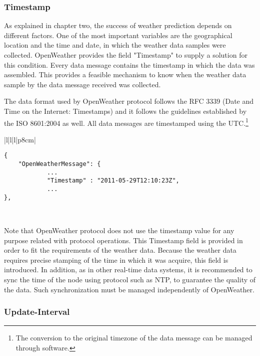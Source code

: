 \subsubsection{Timestamp}

As explained in chapter two, the success of weather prediction depends on different factors. One of the most important variables are the geographical location and the time and date, in which the weather data samples were collected. OpenWeather provides the field "Timestamp" to supply a solution for this condition. Every data message contains the timestamp in which the data was assembled. This provides a feasible mechanism to know when the weather data sample by the data message received was collected.

The data format used by OpenWeather protocol follows the \gls{RFC} 3339 (Date and Time on the Internet: Timestamps)\cite{rfc3339} and it follows the guidelines established by the \gls{ISO} 8601:2004\cite{ISO8601} as well. All data messages are timestamped using the \gls{UTC}.\footnote{The conversion to the original timezone of the data message can be managed through software.}

\begin{table}[H]
\centering
\begin{tabular}{|l|l|l|p{8cm}|}
\hline
\begin{minipage}[t]{\linewidth}
	\begin{verbatim}
{
    "OpenWeatherMessage": {
            ...
            "Timestamp" : "2011-05-29T12:10:23Z",
            ...
},
      \end{verbatim}
\end{minipage} \\
\hline
\end{tabular}
\caption{Timestamp field in a data message of OpenWeather.}
\end{table}

Note that OpenWeather protocol does not use the timestamp value for any purpose related with protocol operations. This Timestamp field is provided in order to fit the requirements of the weather data. Because the weather data requires precise stamping of the time in which it was acquire, this field is introduced. In addition, as in other real-time data systems, it is recommended to sync the time of the node using protocol such as \gls{NTP}, to guarantee the quality of the data. Such synchronization must be managed independently of OpenWeather.


\subsubsection{Update-Interval}

